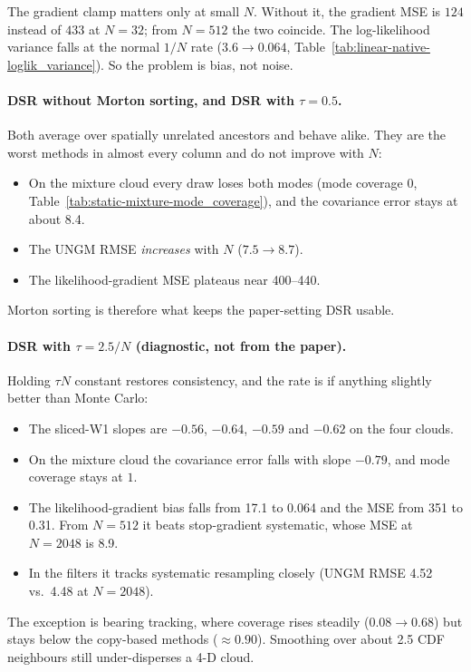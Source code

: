 The gradient clamp matters only at small $N$. Without it, the gradient MSE is $124$ instead of $433$ at $N{=}32$; from $N{=}512$ the two coincide. The log-likelihood variance falls at the normal $1/N$ rate ($3.6\to0.064$, Table~\ref{tab:linear-native-loglik_variance}). So the problem is bias, not noise.

\paragraph{DSR without Morton sorting, and DSR with $\tau{=}0.5$.}
Both average over spatially unrelated ancestors and behave alike. They are the worst methods in almost every column and do not improve with $N$:
\begin{itemize}
\item On the mixture cloud every draw loses both modes (mode coverage $0$, Table~\ref{tab:static-mixture-mode_coverage}), and the covariance error stays at about 8.4.
\item The UNGM RMSE \emph{increases} with $N$ ($7.5\to8.7$).
\item The likelihood-gradient MSE plateaus near 400--440.
\end{itemize}
Morton sorting is therefore what keeps the paper-setting DSR usable.

\paragraph{DSR with $\tau{=}2.5/N$ (diagnostic, not from the paper).}
Holding $\tau N$ constant restores consistency, and the rate is if anything slightly better than Monte Carlo:
\begin{itemize}
\item The sliced-W1 slopes are $-0.56$, $-0.64$, $-0.59$ and $-0.62$ on the four clouds.
\item On the mixture cloud the covariance error falls with slope $-0.79$, and mode coverage stays at $1$.
\item The likelihood-gradient bias falls from 17.1 to 0.064 and the MSE from 351 to 0.31. From $N{=}512$ it beats stop-gradient systematic, whose MSE at $N{=}2048$ is 8.9.
\item In the filters it tracks systematic resampling closely (UNGM RMSE 4.52 vs.\ 4.48 at $N{=}2048$).
\end{itemize}
The exception is bearing tracking, where coverage rises steadily ($0.08\to0.68$) but stays below the copy-based methods ($\approx0.90$). Smoothing over about 2.5 CDF neighbours still under-disperses a 4-D cloud.

